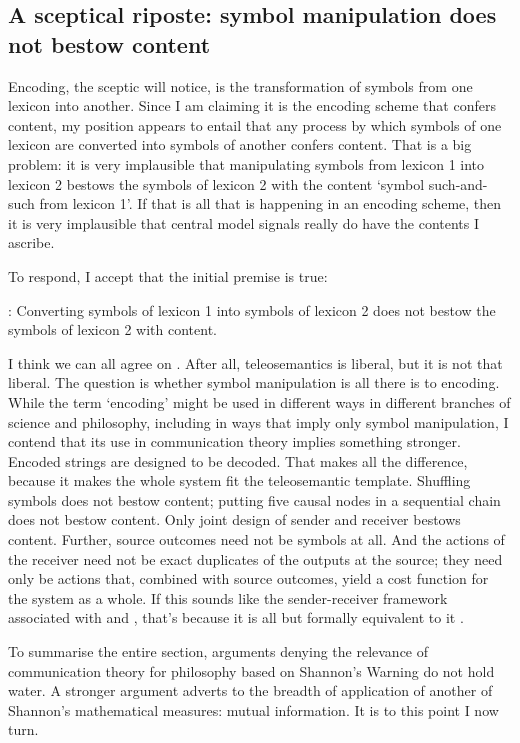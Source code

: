 \subsection{A sceptical riposte: symbol manipulation does not bestow content}

Encoding, the sceptic will notice, is the transformation of symbols from one lexicon into another.
Since I am claiming it is the encoding scheme that confers content, my position appears to entail that any process by which symbols of one lexicon are converted into symbols of another confers content.
That is a big problem: it is very implausible that manipulating symbols from lexicon 1 into lexicon 2 bestows the symbols of lexicon 2 with the content `symbol such-and-such from lexicon 1'.
If that is all that is happening in an encoding scheme, then it is very implausible that central model signals really do have the contents I ascribe.

To respond, I accept that the initial premise is true:

\begin{myquote}
\smi{}: Converting symbols of lexicon 1 into symbols of lexicon 2 does not bestow the symbols of lexicon 2 with content.
\end{myquote}

\noindent I think we can all agree on \smi{}.
After all, teleosemantics is liberal, but it is not that liberal.
The question is whether symbol manipulation is all there is to encoding.
While the term `encoding' might be used in different ways in different branches of science and philosophy, including in ways that imply only symbol manipulation, I contend that its use in communication theory implies something stronger.
Encoded strings are designed to be decoded. 
That makes all the difference, because it makes the whole system fit the teleosemantic template. Shuffling symbols does not bestow content; putting five causal nodes in a sequential chain does not bestow content. 
Only joint design of sender and receiver bestows content.
Further, source outcomes need not be symbols at all. 
And the actions of the receiver need not be exact duplicates of the outputs at the source; they need only be actions that, combined with source outcomes, yield a cost function for the system as a whole.
If this sounds like the sender-receiver framework associated with \citet{skyrms2010signals} and \citet{lewis1969convention}, that's because it is all but formally equivalent to it \citep{martinez2019deception}.

To summarise the entire section, arguments denying the relevance of communication theory for philosophy based on {\sc Shannon's Warning} do not hold water.
A stronger argument adverts to the breadth of application of another of Shannon's mathematical measures: mutual information.
It is to this point I now turn.

